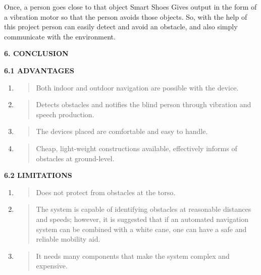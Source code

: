 \documentclass{article}
\begin{document}
Once, a person goes close to that object Smart Shoes Gives output in the
form of a vibration motor so that the person avoids those objects. So,
with the help of this project person can easily detect and avoid an
obstacle, and also simply communicate with the environment.

\textbf{6. CONCLUSION}

\textbf{6.1 ADVANTAGES}

\begin{enumerate}
\def\labelenumi{\arabic{enumi}.}
\item
  \begin{quote}
  Both indoor and outdoor navigation are possible with the device.
  \end{quote}
\item
  \begin{quote}
  Detects obstacles and notifies the blind person through vibration and
  speech production.
  \end{quote}
\item
  \begin{quote}
  The devices placed are comfortable and easy to handle.
  \end{quote}
\item
  \begin{quote}
  Cheap, light-weight constructions available, effectively informs of
  obstacles at ground-level.
  \end{quote}
\end{enumerate}

\textbf{6.2 LIMITATIONS}

\begin{enumerate}
\def\labelenumi{\arabic{enumi}.}
\item
  \begin{quote}
  Does not protect from obstacles at the torso.
  \end{quote}
\item
  \begin{quote}
  The system is capable of identifying obstacles at reasonable distances
  and speeds; however, it is suggested that if an automated navigation
  system can be combined with a white cane, one can have a safe and
  reliable mobility aid.
  \end{quote}
\item
  \begin{quote}
  It needs many components that make the system complex and expensive.
  \end{quote}
\end{enumerate}
\end{document}
